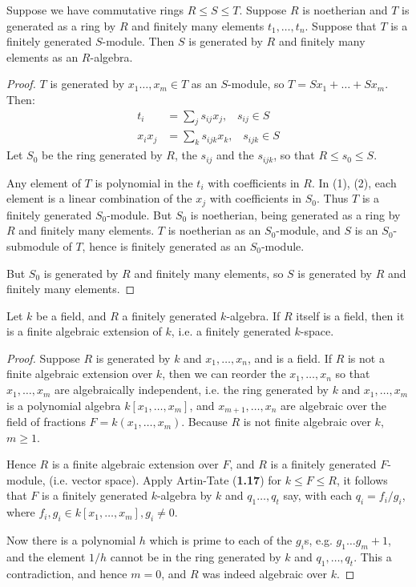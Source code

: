 \documentclass[10pt,a4paper]{article}
\begin{document}
\begin{lemma}
  Suppose we have commutative rings $R \leq S \leq T$. Suppose $R$ is noetherian and $T$ is generated as a ring by $R$ and finitely many elements $t_1, \ldots, t_n$. Suppose that $T$ is a finitely generated $S$-module. Then $S$ is generated by $R$ and finitely many elements as an $R$-algebra.
\end{lemma}
\begin{proof}
  $T$ is generated by $x_1 \ldots, x_m \in T$ as an $S$-module, so $T = Sx_1 + \ldots + Sx_m$. Then:
  \begin{align*}
    t_i &= \sum_j s_{ij}x_j,\;\;\; s_{ij} \in S \tag{1}\\
    x_ix_j &= \sum_k s_{ijk} x_k, \;\;\; s_{ijk} \in S\tag{2}
  \end{align*}
  Let $S_0$ be the ring generated by $R$, the $s_{ij}$ and the $s_{ijk}$, so that $R \leq s_0 \leq S$.

  Any element of $T$ is polynomial in the $t_i$ with coefficients in $R$. In (1), (2), each element is a linear combination of the $x_j$ with coefficients in $S_0$. Thus $T$ is a finitely generated $S_0$-module. But $S_0$ is noetherian, being generated as a ring by $R$ and finitely many elements. $T$ is noetherian as an $S_0$-module, and $S$ is an $S_0$-submodule of $T$, hence is finitely generated as an $S_0$-module.

  But $S_0$ is generated by $R$ and finitely many elements, so $S$ is generated by $R$ and finitely many elements.
\end{proof}
\begin{lemma}[Zariski]
  Let $k$ be a field, and $R$ a finitely generated $k$-algebra. If $R$ itself is a field, then it is a finite algebraic extension of $k$, i.e. a finitely generated $k$-space.
\end{lemma}
\begin{proof}
  Suppose $R$ is generated by $k$ and $x_1, \ldots, x_n$, and is a field. If $R$ is not a finite algebraic extension over $k$, then we can reorder the $x_1, \ldots, x_n$ so that $x_1, \ldots, x_m$ are algebraically independent, i.e. the ring generated by $k$ and $x_1, \ldots, x_m$ is a polynomial algebra $k[x_1, \ldots, x_m]$, and $x_{m+1},\ldots, x_n$ are algebraic over the field of fractions $F = k(x_1, \ldots, x_m)$. Because $R$ is not finite algebraic over $k$, $m\geq 1$.

  Hence $R$ is a finite algebraic extension over $F$, and $R$ is a finitely generated $F$-module, (i.e. vector space). Apply Artin-Tate (\textbf{1.17}) for $k \leq F \leq R$, it follows that $F$ is a finitely generated $k$-algebra by $k$ and $q_1 \ldots, q_t$ say, with each $q_i =f_i/g_i$, where $f_i, g_i \in k[x_1, \ldots, x_m], g_i \neq 0$.

  Now there is a polynomial $h$ which is prime to each of the $g_i$s, e.g. $g_1\ldots g_m + 1$, and the element $1/h$ cannot be in the ring generated by $k$ and $q_1, \ldots, q_t$. This a contradiction, and hence $m=0$, and $R$ was indeed algebraic over $k$.
\end{proof}
\end{document}
